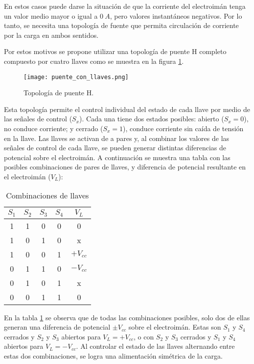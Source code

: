 En estos casos puede darse la situación de que la corriente del electroimán tenga un valor medio mayor o igual a $0\:A$, pero valores instantáneos negativos. Por lo tanto, se necesita una topología de fuente que permita circulación de corriente por la carga en ambos sentidos.

Por estos motivos se propone utilizar una topología de puente H completo compuesto por cuatro llaves como se muestra en la figura \ref{fig:img_topologia_simplificada}.

\begin{figure}[H]
	\centering
	\texttt{[image: puente\_con\_llaves.png]}
	\caption{Topología de puente H.}
	\label{fig:img_topologia_simplificada}
\end{figure}

Esta topología permite el control individual del estado de cada llave por medio de las señales de control ($S_x$). Cada una tiene dos estados posibles: abierto ($S_x=0$), no conduce corriente; y cerrado ($S_x=1$), conduce corriente sin caída de tensión en la llave. Las llaves se activan de a pares y, al combinar los valores de las señales de control de cada llave, se pueden generar distintas diferencias de potencial sobre el electroimán. A continuación se muestra una tabla con las posibles combinaciones de pares de llaves, y diferencia de potencial resultante en el electroimán ($V_L$):

\begin{table}[H]
	\begin{center}
		\begin{tabular}{| c | c | c | c | c |}
			\hline
			$S_1$ & $S_2$ & $S_3$ & $S_4$ & $V_L$ \\ \hline
			1 & 1 & 0 & 0 & 0 \\ \hline 
			1 & 0 & 1 & 0 & x \\ \hline 
			1 & 0 & 0 & 1 & $+V_{cc}$ \\ \hline 
			0 & 1 & 1 & 0 & $-V_{cc}$ \\ \hline 
			0 & 1 & 0 & 1 & x \\ \hline 
			0 & 0 & 1 & 1 & 0 \\ \hline 
		\end{tabular}
		\caption{Combinaciones de llaves}
		\label{tab_llaves}
	\end{center}
\end{table}

En la tabla \ref{tab_llaves} se observa que de todas las combinaciones posibles, solo dos de ellas generan una diferencia de potencial $\pm V_{cc}$ sobre el electroimán. Estas son  $S_1$ y $S_4$ cerrados y $S_2$ y $S_3$ abiertos para $V_L=+V_{cc}$, o con $S_2$ y $S_3$ cerrados y $S_1$ y $S_4$ abiertos para $V_L=-V_{cc}$. Al controlar el estado de las llaves alternando entre estas dos combinaciones, se logra una alimentación simétrica de la carga.

